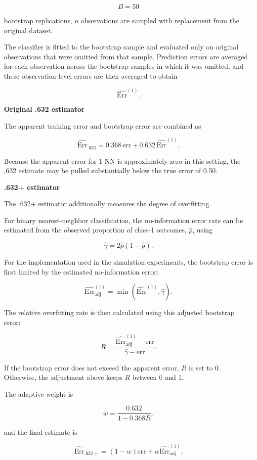 \documentclass[
  letterpaper,
  DIV=11,
  numbers=noendperiod]{scrreprt}
\begin{document}
\[
B=50
\]

bootstrap replications, \(n\) observations are sampled with replacement
from the original dataset.

The classifier is fitted to the bootstrap sample and evaluated only on
original observations that were omitted from that sample. Prediction
errors are averaged for each observation across the bootstrap samples in
which it was omitted, and these observation-level errors are then
averaged to obtain

\[
\widehat{\mathrm{Err}}^{(1)}.
\]

\textbf{Original .632 estimator}

The apparent training error and bootstrap error are combined as

\[
\widehat{\mathrm{Err}}_{.632}
=
0.368\,\mathrm{err}
+
0.632\,\widehat{\mathrm{Err}}^{(1)}.
\]

Because the apparent error for 1-NN is approximately zero in this
setting, the .632 estimate may be pulled substantially below the true
error of 0.50.

\textbf{.632+ estimator}

The .632+ estimator additionally measures the degree of overfitting.

For binary nearest-neighbor classification, the no-information error
rate can be estimated from the observed proportion of class-1 outcomes,
\(\widehat p\), using

\[
\widehat{\gamma}
=
2\widehat{p}(1-\widehat{p}).
\]

For the implementation used in the simulation experiments, the bootstrap
error is first limited by the estimated no-information error:

\[
\widehat{\mathrm{Err}}_{\mathrm{adj}}^{(1)}
=
\min\left(
\widehat{\mathrm{Err}}^{(1)},
\widehat{\gamma}
\right).
\]

The relative overfitting rate is then calculated using this adjusted
bootstrap error:

\[
R
=
\frac{
\widehat{\mathrm{Err}}_{\mathrm{adj}}^{(1)}-\mathrm{err}
}{
\widehat{\gamma}-\mathrm{err}
}.
\]

If the bootstrap error does not exceed the apparent error, \(R\) is set
to 0. Otherwise, the adjustment above keeps \(R\) between 0 and 1.

The adaptive weight is

\[
w
=
\frac{0.632}{1-0.368R},
\]

and the final estimate is

\[
\widehat{\mathrm{Err}}_{.632+}
=
(1-w)\mathrm{err}
+
w\widehat{\mathrm{Err}}_{\mathrm{adj}}^{(1)}.
\]
\end{document}
